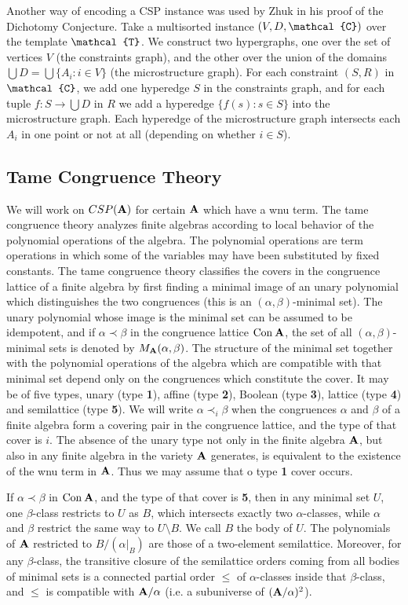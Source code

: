\documentclass[11pt]{amsart}
\newcommand{\m}[1]{{\uppercase {\mathbf {#1}}}}
\newcommand{\vr}[1]{{\uppercase {\mathcal{#1}}}}
\newcommand{\con}{{\rm Con\:}}
\newcommand{\cn}[1]{{\con\m {#1}}}
\newcommand{\Cn}[1]{{{\bf\con}\m {#1}}}
\theoremstyle{definition}
\begin{document}
Another way of encoding a CSP instance was used by Zhuk in his proof of the Dichotomy Conjecture. Take a multisorted instance $(V,D,\vr c)$ over the template $\vr t$. We construct two hypergraphs, one over the set of vertices $V$ (the constraints graph), and the other over the union of the domains $\bigcup D=\bigcup\{A_i:i\in V\}$ (the microstructure graph). For each constraint $(S,R)$ in $\vr c$, we add one hyperedge $S$ in the constraints graph, and for each tuple $f:S\rightarrow\bigcup D$ in $R$ we add a hyperedge $\{f(s):s\in S\}$ into the microstructure graph. Each hyperedge of the microstructure graph intersects each $A_i$ in one point or not at all (depending on whether $i\in S$).

\subsection{Tame Congruence Theory} We will work on $CSP(\m a)$ for certain $\m a$ which have a wnu term. The tame congruence theory analyzes finite algebras according to local behavior of the polynomial operations of the algebra. The polynomial operations are term operations in which some of the variables may have been substituted by fixed constants. The tame congruence theory classifies the covers in the congruence lattice of a finite algebra by first finding a minimal image of an unary polynomial which distinguishes the two congruences (this is an $(\alpha,\beta)$-minimal set). The unary polynomial whose image is the minimal set can be assumed to be idempotent, and if $\alpha\prec \beta$ in the congruence lattice $\cn a$, the set of all $(\alpha,\beta)$-minimal sets is denoted by $M_{\m a}(\alpha,\beta)$. The structure of the minimal set together with the polynomial operations of the algebra which are compatible with that minimal set depend only on the congruences which constitute the cover. It may be of five types, unary (type {\bf 1}), affine (type {\bf 2}), Boolean (type {\bf 3}), lattice (type {\bf 4}) and semilattice (type {\bf 5}). We will write $\alpha\prec_i\beta$ when the congruences $\alpha$ and $\beta$ of a finite algebra form a covering pair in the congruence lattice, and the type of that cover is $i$. The absence of the unary type not only in the finite algebra $\m a$, but also in any finite algebra in the variety $\m a$ generates, is equivalent to the existence of the wnu term in $\m a$. Thus we may assume that 
o type {\bf 1} cover occurs.

If $\alpha\prec\beta$ in $\Cn a$, and the type of that cover is {\bf 5}, then in any minimal set $U$, one $\beta$-class restricts to $U$ as $B$, which intersects exactly two $\alpha$-classes, while $\alpha$ and $\beta$ restrict the same way to $U\setminus B$. We call $B$ the body of $U$. The polynomials of $\m a$ restricted to $B/(\alpha|_B)$ are those of a two-element semilattice. Moreover, for any $\beta$-class, the transitive closure of the semilattice orders coming from all bodies of minimal sets is a connected partial order $\leq$ of $\alpha$-classes inside that $\beta$-class, and $\leq$ is compatible with $\m a/\alpha$ (i.e. a subuniverse of $(\m a/\alpha)^2$).
\end{document}
